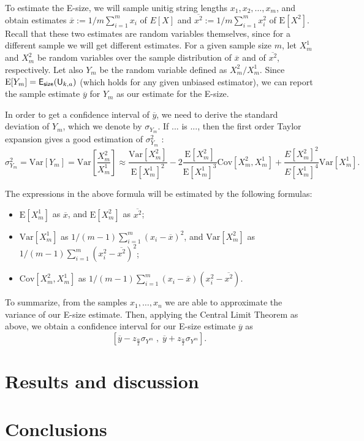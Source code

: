 \documentclass[a4paper,11pt]{article}
\newcommand{\U}{\mathsf{U}_{k,a}}
\newcommand{\esize}{{\sf E_{size}}}
\newcommand{\Var}{\text{Var}}
\newcommand{\Cov}{\text{Cov}}
\newcommand{\E}{\text{E}}
\begin{document}
To estimate the E-size, we will sample unitig string lengths $x_1,x_2,\dots,x_m$, and obtain estimates $\overline{x} := 1/m\sum_{i=1}^{m} x_i$ of $E[X]$ and $\overline{x^2} := 1/m\sum_{i=1}^{m} x_i^2$ of $\E[X^2]$. Recall that these two estimates are random variables themselves, since for a different sample we will get different estimates. For a given sample size $m$, let $X^1_{m}$ and $X^2_{m}$ be random variables over the sample distribution of $\overline{x}$ and of $\overline{x^2}$, respectively. Let also $Y_m$ be the random variable defined as $X^2_m/X^1_m$. Since $\E[Y_m] = \esize(\U)$ (which holds for any given unbiased estimator), we can report the sample estimate $\overline{y}$ for $Y_m$ as our estimate for the E-size. 

In order to get a confidence interval of $\overline{y}$, we need to derive the standard deviation of $Y_m$, which we denote by $\sigma_{Y_m}$. If ... is ..., then the first order Taylor expansion gives a good estimation of $\sigma_{Y_m}^2$ \cite{Benaroya:2005aa}:
\[\sigma_{Y_m}^2 = \Var\left[Y_m\right] = \Var\left[\frac{X^2_m}{X^1_m}\right] \approx \frac{\Var\left[X^2_m\right]}{\E\left[X^1_m\right]^2} -2\frac{\E\left[X^2_m\right]}{\E\left[X^1_m\right]^3}\Cov\left[X^2_m,X^1_m\right] + \frac{E\left[X^2_m\right]^2}{E\left[X^1_m\right]^4}\Var\left[X^1_m\right].\] 

The expressions in the above formula will be estimated by the following formulas:
\begin{itemize}
\item $\E[X^1_m]$ as $\overline{x}$, and $\E[X^2_m]$ as $\overline{x^2}$;
\item $\Var[X^1_m]$ as $1/(m-1) \sum_{i = 1}^{m} (x_i - \overline{x})^2$, and $\Var[X^2_m]$ as $1/(m-1) \sum_{i = 1}^{m} (x_i^2 - \overline{x^2})^2$;
\item $\Cov[X^2_m,X^1_m]$ as $1/(m-1) \sum_{i=1}^{m} (x_i - \overline{x})(x_i^2 - \overline{x^2})$. 

\end{itemize}

To summarize, from the samples $x_1,\dots, x_n$ we are able to approximate the variance of our E-size estimate. Then, applying the Central Limit Theorem as above, we obtain a confidence interval for our E-size estimate $\overline{y}$ as 
\[\left[\overline{y} - z_{\frac{\alpha}{2}}\sigma_{Y^m} \;,\; \overline{y} + z_{\frac{\alpha}{2}}\sigma_{Y^m}\right]. \]


\section{Results and discussion} %
\label{sec:results_and_discussion}


\section{Conclusions} %
\label{sec:conclusions}




\end{document}
